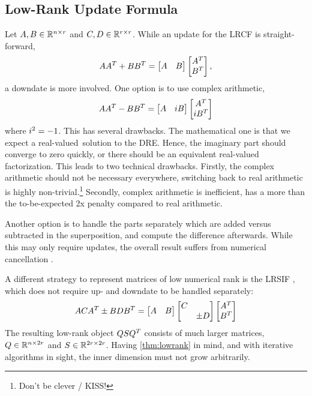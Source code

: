 \subsection{Low-Rank Update Formula}
\label{sec:lr:update}

Let $A, B \in\mathbb{R}^{n\times r}$ and $C, D\in\mathbb{R}^{r\times r}$.
While an update for the \ac{LRCF} is straight-forward,
\begin{equation}
  AA^T + BB^T =
  \begin{bmatrix}
    A & B
  \end{bmatrix}
  \begin{bmatrix}
    A^T \\ B^T
  \end{bmatrix}
  ,
\end{equation}
a downdate is more involved.
One option is to use complex arithmetic, \ie
\begin{equation}
  AA^T - BB^T =
  \begin{bmatrix}
    A & i B
  \end{bmatrix}
  \begin{bmatrix}
    A^T \\ i B^T
  \end{bmatrix}
\end{equation}
where $i^2=-1$.
This has several drawbacks.
The mathematical one is that we expect a real-valued\ solution to the \ac{DRE}.
Hence, the imaginary part should converge to zero quickly,
or there should be an equivalent real-valued factorization.
This leads to two technical drawbacks.
Firstly, the complex arithmetic should not be necessary everywhere,
switching back to real arithmetic is highly non-trivial.\footnote{Don't be clever / KISS!}
Secondly, complex arithmetic is inefficient, \ie has a more than the to-be-expected 2x penalty compared to real arithmetic.

Another option is to handle the parts separately which are added versus subtracted in the superposition,
and compute the difference afterwards.
While this may only require updates,
the overall result suffers from numerical cancellation
\cite[50]{Lang2015}
\cite[\pno~186, thesis~10]{Lang2017}.

A different strategy to represent matrices of low numerical rank is the \ac{LRSIF} \cite{Benner2009,Lang2015},
which does not require up- and downdate to be handled separately:
\begin{equation}
  ACA^T \pm BDB^T =
  \begin{bmatrix}
    A & B
  \end{bmatrix}
  \begin{bmatrix}
    C \\ & \pm D
  \end{bmatrix}
  \begin{bmatrix}
    A^T \\ B^T
  \end{bmatrix}
\end{equation}
The resulting low-rank object $QSQ^T$ consists of much larger matrices,
$Q \in\mathbb{R}^{n\times 2r}$ and $S\in\mathbb{R}^{2r\times 2r}$.
Having \autoref{thm:lowrank} in mind,
and with iterative algorithms in sight,
the inner dimension must not grow arbitrarily.

